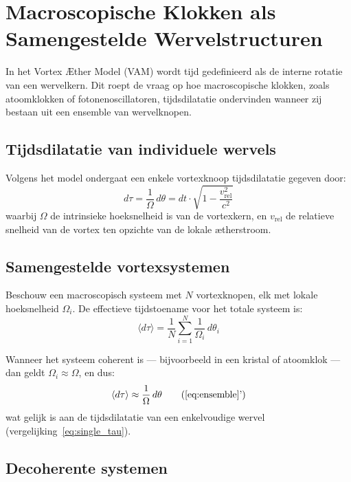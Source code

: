 \section{Macroscopische Klokken als Samengestelde Wervelstructuren}

In het Vortex Æther Model (VAM) wordt tijd gedefinieerd als de interne rotatie van een wervelkern. Dit roept de vraag op hoe macroscopische klokken, zoals atoomklokken of fotonenoscillatoren, tijdsdilatatie ondervinden wanneer zij bestaan uit een ensemble van wervelknopen.

\subsection*{Tijdsdilatatie van individuele wervels}

Volgens het model ondergaat een enkele vortexknoop tijdsdilatatie gegeven door:
\begin{equation}
    d\tau = \frac{1}{\Omega} \, d\theta = dt \cdot \sqrt{1 - \frac{v_{\text{rel}}^2}{c^2}} \label{eq:single_tau}
\end{equation}
waarbij \( \Omega \) de intrinsieke hoeksnelheid is van de vortexkern, en \( v_{\text{rel}} \) de relatieve snelheid van de vortex ten opzichte van de lokale ætherstroom.

\subsection*{Samengestelde vortexsystemen}

Beschouw een macroscopisch systeem met \( N \) vortexknopen, elk met lokale hoeksnelheid \( \Omega_i \). De effectieve tijdstoename voor het totale systeem is:
\begin{equation}
    \langle d\tau \rangle = \frac{1}{N} \sum_{i=1}^{N} \frac{1}{\Omega_i} \, d\theta_i \label{eq:ensemble}
\end{equation}

Wanneer het systeem coherent is — bijvoorbeeld in een kristal of atoomklok — dan geldt \( \Omega_i \approx \Omega \), en dus:
\begin{equation}
    \langle d\tau \rangle \approx \frac{1}{\Omega} \, d\theta \tag{\ref{eq:ensemble}'}
\end{equation}
wat gelijk is aan de tijdsdilatatie van een enkelvoudige wervel (vergelijking~\ref{eq:single_tau}).

\subsection*{Decoherente systemen}

